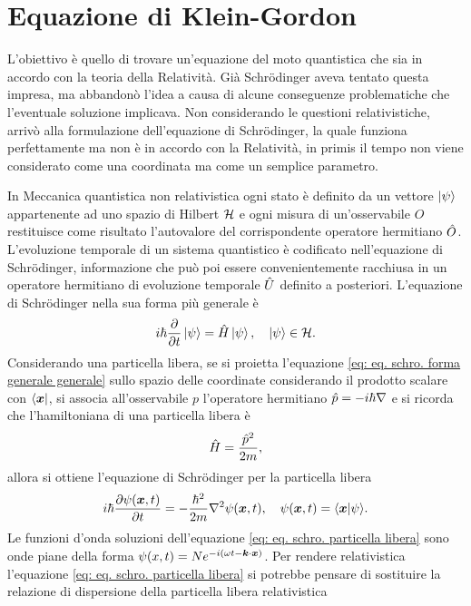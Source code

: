 \chapter{Equazione di Klein-Gordon}
L'obiettivo è quello di trovare un'equazione del moto quantistica che sia in accordo con la teoria della Relatività. Già Schr\"odinger aveva tentato questa impresa, ma abbandonò l'idea a causa di alcune conseguenze problematiche che l'eventuale soluzione implicava. Non considerando le questioni relativistiche, arrivò alla formulazione dell'equazione di Schr\"odinger, la quale funziona perfettamente ma non è in accordo con la Relatività, in primis il tempo non viene considerato come una coordinata ma come un semplice parametro.

In Meccanica quantistica non relativistica ogni stato è definito da un vettore $\ket{\psi}$ appartenente ad uno spazio di Hilbert $\mathcal{H}$ e ogni misura di un'osservabile $O$ restituisce come risultato l'autovalore del corrispondente operatore hermitiano $\hat{O}$. L'evoluzione temporale di un sistema quantistico è codificato nell'equazione di Schr\"odinger, informazione che può poi essere convenientemente racchiusa in un operatore hermitiano di evoluzione temporale $\hat{U}$ definito a posteriori. L'equazione di Schr\"odinger nella sua forma più generale è
\begin{equation}
\label{eq: eq. schro. forma generale generale}
    i\hbar\frac{\partial}{\partial t}\ket{\psi} = \hat{H}\ket{\psi},\quad\ket{\psi}\in\mathcal{H}.
\end{equation}
Considerando una particella libera, se si proietta l'equazione \eqref{eq: eq. schro. forma generale generale} sullo spazio delle coordinate considerando il prodotto scalare con $\bra{\bm{x}}$, si associa all'osservabile $p$ l'operatore hermitiano $\hat{p}=-i\hbar\nabla$ e si ricorda che l'hamiltoniana di una particella libera è 
\begin{equation}
\label{eq: hamiltoniana particella libera}
    \hat{H} = \frac{\hat{p}^2}{2m},
\end{equation}
allora si ottiene l'equazione di Schr\"odinger per la particella libera
\begin{equation}
\label{eq: eq. schro. particella libera}
    i\hbar\frac{\partial\psi(\bm{x},t)}{\partial t} = -\frac{\hbar^2}{2m}\nabla^2\psi(\bm{x},t),\quad\psi(\bm{x},t) = \langle \bm{x} | \psi \rangle.
\end{equation}
Le funzioni d'onda soluzioni dell'equazione \eqref{eq: eq. schro. particella libera} sono onde piane della forma $\psi(x,t)=Ne^{-i(\omega t-\bm{k}\cdot\bm{x})}$. Per rendere relativistica l'equazione \eqref{eq: eq. schro. particella libera} si potrebbe pensare di sostituire la relazione di dispersione della particella libera relativistica
